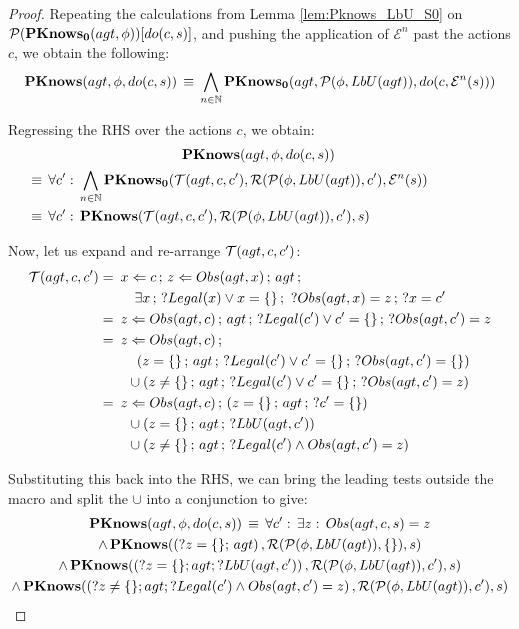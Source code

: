 \begin{proof}
Repeating the calculations from Lemma \ref{lem:Pknows_LbU_S0} on
$\mathcal{P}(\mathbf{PKnows_{0}}(agt,\phi))[do(c,s)]$, and pushing the application
of $\mathcal{E}^{n}$ past the actions $c$, we obtain the following:\[
\mathbf{PKnows}(agt,\phi,do(c,s))\,\equiv\,\bigwedge_{n\in\mathbb{N}}\mathbf{PKnows_{0}}(agt,\mathcal{P}(\phi,LbU(agt)),do(c,\mathcal{E}^{n}(s)))\]


Regressing the RHS over the actions $c$, we obtain:\begin{multline*}
\PKnows(agt,\phi,do(c,s))\,\\
\shoveleft{\equiv\,\forall c':\,\bigwedge_{n\in\mathbb{N}}\PKnowsZ(\Trn(agt,c,c'),\Reg(\Pst(\phi,\LbU(agt)),c'),\mathcal{E}^{n}(s))}\\
\shoveleft{\equiv\,\forall c':\,\PKnows(\Trn(agt,c,c'),\Reg(\Pst(\phi,\LbU(agt)),c'),s)}\,\,\,\,\,\,\,\,\,\,\,\,\,\,\,\,\,\,\,\,\,\,\,\,\,\,\,\,\,\,\,\,\,\,\,\,\,\,\,\,\,\,\,\,\,\,\,\,\,\,\,\,\,\,\,\,\end{multline*}


Now, let us expand and re-arrange $\mathcal{T}(agt,c,c')$:\begin{align*}
\mathcal{T}(agt,c,c')=\,\,\, & x\Leftarrow c\,;\, z\Leftarrow Obs(agt,x)\,;\, agt\,;\\
 & \,\,\,\,\,\,\exists x\,;\,?Legal(x)\vee x=\{\}\,;\,\,?Obs(agt,x)=z\,;\,?x=c'\\
=\,\,\, & z\Leftarrow Obs(agt,c)\,;\, agt\,;\,?Legal(c')\vee c'=\{\}\,;\,?Obs(agt,c')=z\\
=\,\,\, & z\Leftarrow Obs(agt,c)\,;\\
 & \,\,\,\,\,\,\left(z=\{\}\,;\, agt\,;\,?Legal(c')\vee c'=\{\}\,;\,?Obs(agt,c')=\{\}\right)\\
 & \,\,\,\cup\left(z\neq\{\}\,;\, agt\,;\,?Legal(c')\vee c'=\{\}\,;\,?Obs(agt,c')=z\right)\\
=\,\,\, & z\Leftarrow Obs(agt,c)\,;\,\left(z=\{\}\,;\, agt\,;\,?c'=\{\}\right)\\
 & \,\,\,\cup\left(z=\{\}\,;\, agt\,;\,?LbU(agt,c')\right)\\
 & \,\,\,\cup\left(z\neq\{\}\,;\, agt\,;\,?Legal(c')\wedge Obs(agt,c')=z\right)\end{align*}


Substituting this back into the RHS, we can bring the leading tests
outside the macro and split the $\cup$ into a conjunction to give:\begin{multline*}
\mathbf{PKnows}(agt,\phi,do(c,s))\,\equiv\,\forall c':\,\exists z:\, Obs(agt,c,s)=z\\
\wedge\,\mathbf{PKnows}(\left(?z=\{\};\, agt\right),\mathcal{R}(\mathcal{P}(\phi,LbU(agt)),\{\}),s)\\
\wedge\,\mathbf{PKnows}(\left(?z=\{\};agt;?LbU(agt,c')\right),\mathcal{R}(\mathcal{P}(\phi,LbU(agt)),c'),s)\\
\wedge\,\mathbf{PKnows}(\left(?z\neq\{\};agt;?Legal(c')\wedge Obs(agt,c')=z\right),\mathcal{R}(\mathcal{P}(\phi,LbU(agt)),c'),s)\end{multline*}



\end{proof}
